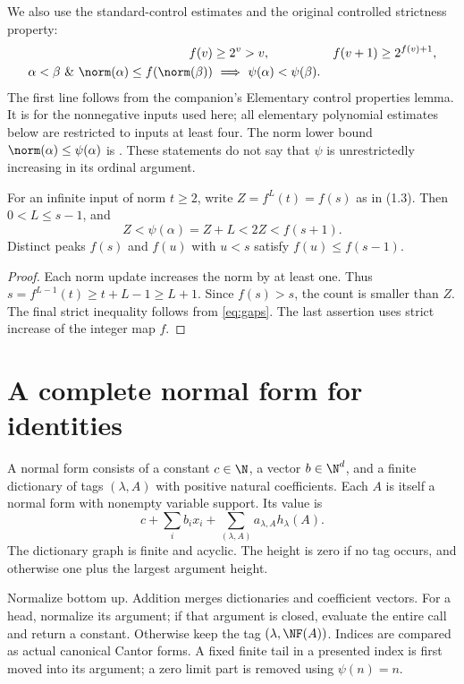 \documentclass[11pt,a4paper]{article}
\begin{document}
We also use the standard-control estimates and the original controlled
strictness property:
\begin{align}
 f(v)&\ge2^v>v,& f(v+1)&\ge2^{f(v)+1},                \label{eq:gaps}\\
 \alpha<\beta\ \&\ \norm(\alpha)\le f(\norm(\beta))
 &\ \Longrightarrow\ \psi(\alpha)<\psi(\beta).
                                                               \label{eq:strict}
\end{align}
The first line follows from the companion's Elementary control properties
lemma. It is for the nonnegative inputs used here; all elementary
polynomial estimates below are restricted to inputs at least four.
The norm lower bound $\norm(\alpha)\le\psi(\alpha)$ is
\cite[Proposition 2.3]{ww}. These statements do not say that $\psi$ is
unrestrictedly increasing in its ordinal argument.

\begin{lemma}\label{lem:sparse}
For an infinite input of norm $t\ge2$, write $Z=f^L(t)=f(s)$ as in (1.3).
Then $0<L\le s-1$, and
\[
           Z<\psi(\alpha)=Z+L<2Z<f(s+1).             \tag{1.6}
\]
Distinct peaks $f(s)$ and $f(u)$ with $u<s$ satisfy $f(u)\le f(s-1)$.
\end{lemma}
\begin{proof}
Each norm update increases the norm by at least one. Thus
$s=f^{L-1}(t)\ge t+L-1\ge L+1$. Since $f(s)>s$, the count is smaller than
$Z$. The final strict inequality follows from \eqref{eq:gaps}. The last
assertion uses strict increase of the integer map $f$.
\end{proof}

\section{A complete normal form for identities}
\begin{definition}\label{def:nf}
A normal form consists of a constant $c\in\N$, a vector
$b\in\N^d$, and a finite dictionary of tags $(\lambda,A)$ with positive
natural coefficients. Each $A$ is itself a normal form with nonempty
variable support. Its value is
\[
       c+\sum_i b_i x_i+\sum_{(\lambda,A)} a_{\lambda,A}h_\lambda(A).
                                                               \tag{2.1}
\]
The dictionary graph is finite and acyclic. The height is zero if no tag
occurs, and otherwise one plus the largest argument height.
\end{definition}
Normalize bottom up. Addition merges dictionaries and coefficient vectors.
For a head, normalize its argument; if that argument is closed, evaluate
the entire call and return a constant. Otherwise keep the tag
$(\lambda,\NF(A))$. Indices are compared as actual canonical Cantor forms.
A fixed finite tail in a presented index is first moved into its argument;
a zero limit part is removed using $\psi(n)=n$.
\end{document}
